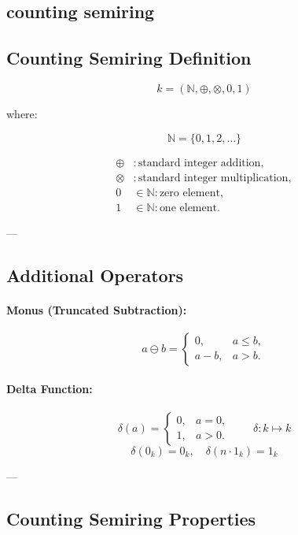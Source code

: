 \subsection{counting semiring}
\begin{toappendix}

\section*{Counting Semiring Definition}

\[
k = (\mathbb{N}, \oplus, \otimes, 0, 1)
\]

where:

\[
\mathbb{N} = \{0, 1, 2, \dots\}
\]

\[
\begin{aligned}
\oplus &: \text{standard integer addition}, \\
\otimes &: \text{standard integer multiplication}, \\
0 &\in \mathbb{N} : \text{zero element}, \\
1 &\in \mathbb{N} : \text{one element}.
\end{aligned}
\]

---

\subsection*{Additional Operators}

\paragraph{Monus (Truncated Subtraction):}
\[
a \ominus b = 
\begin{cases}
0, & a \le b, \\
a - b, & a > b.
\end{cases}
\]

\paragraph{Delta Function:}
\[
\delta(a) = 
\begin{cases}
0, & a = 0, \\
1, & a > 0.
\end{cases}
\qquad
\delta : k \mapsto k
\]
\[
\delta(0_k) = 0_k, \quad \delta(n \cdot 1_k) = 1_k
\]

---

\subsection*{Counting Semiring Properties}


\end{toappendix}
